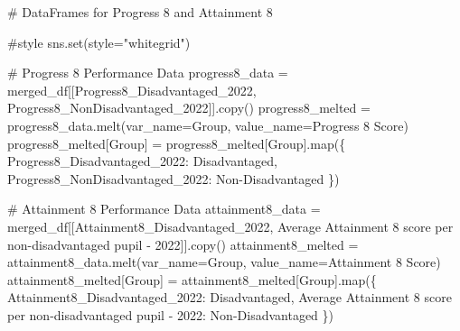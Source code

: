 \documentclass[
  letterpaper,
  DIV=11,
  numbers=noendperiod]{scrartcl}
\newenvironment{Shaded}{\begin{snugshade}}{\end{snugshade}}
\newcommand{\BuiltInTok}[1]{\textcolor[rgb]{0.00,0.23,0.31}{#1}}
\newcommand{\CommentTok}[1]{\textcolor[rgb]{0.37,0.37,0.37}{#1}}
\newcommand{\NormalTok}[1]{\textcolor[rgb]{0.00,0.23,0.31}{#1}}
\newcommand{\OperatorTok}[1]{\textcolor[rgb]{0.37,0.37,0.37}{#1}}
\newcommand{\StringTok}[1]{\textcolor[rgb]{0.13,0.47,0.30}{#1}}
\begin{document}
\begin{Shaded}
\begin{Highlighting}[]
\CommentTok{\# DataFrames for Progress 8 and Attainment 8}

\CommentTok{\#style}
\NormalTok{sns.}\BuiltInTok{set}\NormalTok{(style}\OperatorTok{=}\StringTok{"whitegrid"}\NormalTok{)}

\CommentTok{\# Progress 8 Performance Data}
\NormalTok{progress8\_data }\OperatorTok{=}\NormalTok{ merged\_df[[}\StringTok{\textquotesingle{}Progress8\_Disadvantaged\_2022\textquotesingle{}}\NormalTok{, }\StringTok{\textquotesingle{}Progress8\_NonDisadvantaged\_2022\textquotesingle{}}\NormalTok{]].copy()}
\NormalTok{progress8\_melted }\OperatorTok{=}\NormalTok{ progress8\_data.melt(var\_name}\OperatorTok{=}\StringTok{\textquotesingle{}Group\textquotesingle{}}\NormalTok{, value\_name}\OperatorTok{=}\StringTok{\textquotesingle{}Progress 8 Score\textquotesingle{}}\NormalTok{)}
\NormalTok{progress8\_melted[}\StringTok{\textquotesingle{}Group\textquotesingle{}}\NormalTok{] }\OperatorTok{=}\NormalTok{ progress8\_melted[}\StringTok{\textquotesingle{}Group\textquotesingle{}}\NormalTok{].}\BuiltInTok{map}\NormalTok{(\{}
    \StringTok{\textquotesingle{}Progress8\_Disadvantaged\_2022\textquotesingle{}}\NormalTok{: }\StringTok{\textquotesingle{}Disadvantaged\textquotesingle{}}\NormalTok{,}
    \StringTok{\textquotesingle{}Progress8\_NonDisadvantaged\_2022\textquotesingle{}}\NormalTok{: }\StringTok{\textquotesingle{}Non{-}Disadvantaged\textquotesingle{}}
\NormalTok{\})}

\CommentTok{\# Attainment 8 Performance Data}
\NormalTok{attainment8\_data }\OperatorTok{=}\NormalTok{ merged\_df[[}\StringTok{\textquotesingle{}Attainment8\_Disadvantaged\_2022\textquotesingle{}}\NormalTok{, }\StringTok{\textquotesingle{}Average Attainment 8 score per non{-}disadvantaged pupil  {-} 2022\textquotesingle{}}\NormalTok{]].copy()}
\NormalTok{attainment8\_melted }\OperatorTok{=}\NormalTok{ attainment8\_data.melt(var\_name}\OperatorTok{=}\StringTok{\textquotesingle{}Group\textquotesingle{}}\NormalTok{, value\_name}\OperatorTok{=}\StringTok{\textquotesingle{}Attainment 8 Score\textquotesingle{}}\NormalTok{)}
\NormalTok{attainment8\_melted[}\StringTok{\textquotesingle{}Group\textquotesingle{}}\NormalTok{] }\OperatorTok{=}\NormalTok{ attainment8\_melted[}\StringTok{\textquotesingle{}Group\textquotesingle{}}\NormalTok{].}\BuiltInTok{map}\NormalTok{(\{}
    \StringTok{\textquotesingle{}Attainment8\_Disadvantaged\_2022\textquotesingle{}}\NormalTok{: }\StringTok{\textquotesingle{}Disadvantaged\textquotesingle{}}\NormalTok{,}
    \StringTok{\textquotesingle{}Average Attainment 8 score per non{-}disadvantaged pupil  {-} 2022\textquotesingle{}}\NormalTok{: }\StringTok{\textquotesingle{}Non{-}Disadvantaged\textquotesingle{}}
\NormalTok{\})}



\end{Highlighting}
\end{Shaded}
\end{document}
